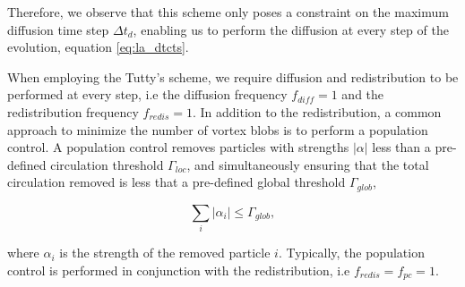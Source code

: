 Therefore, we observe that this scheme only poses a constraint on the maximum diffusion time step $\Delta t_d$, enabling us to perform the diffusion at every step of the evolution, equation \ref{eq:la_dtcts}.

When employing the Tutty's scheme, we require diffusion and redistribution to be performed at every step, i.e the diffusion frequency $f_{diff}=1$ and the redistribution frequency $f_{redis}=1$. In addition to the redistribution, a common approach to minimize the number of vortex blobs is to perform a population control. A population control removes particles with strengths $\left|\alpha\right|$ less than a pre-defined circulation threshold $\Gamma_{loc}$, and simultaneously ensuring that the total circulation removed is less that a pre-defined global threshold $\Gamma_{glob}$,

\begin{equation}
\sum_i \left|\alpha_i\right| \leqslant \Gamma_{glob},
\end{equation}

where $\alpha_i$ is the strength of the removed particle $i$. Typically, the population control is performed in conjunction with the redistribution, i.e $f_{redis}=f_{pc}=1$.




		
%
	
